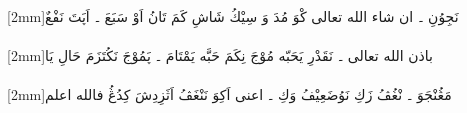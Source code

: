 \documentclass[a4paper, 12pt]{report}
\begin{document}
\begin{flushright}
{\scriptsize{}[2mm]}\textarabic{نَجِوُنِ ۔ ان شاء الله تعالى كْوَ مُدَ وَ سِيْكُ شَاشِ كَمَ تَانُ اَوْ سَبَعَ ۔ اَپَتَ نَفْعٌ} \\ 

 \\ 

{\scriptsize{}[2mm]}\textarabic{باذن الله تعالى ۔ نَقَدْرِ يَحَبّه مُوْجَ نِكَمَ حَبَّه يَمْتَامَ ۔ پَمُوْجَ نَكُتَزَمَ حَالِ يَا} \\ 

 \\ 

{\scriptsize{}[2mm]}\textarabic{مَڠُنْجَوَ ۔ نْغُڤُ زَكِ نَوُضَعِيْفُ وَكِ ۔ اعنى اَكِوَ نَنْغَڤُ اَثَزِدِشَ كِدُڠُ فالله اعلم} \\ 

 \\ 

\end{flushright}
\end{document}

